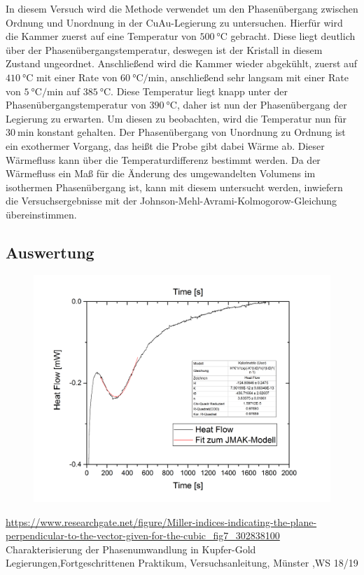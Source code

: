 \documentclass[
	a4paper,
	12pt,
	pagesize,
	ngerman
]{scrartcl}
\begin{document}
In diesem Versuch wird die Methode verwendet um den Phasenübergang zwischen Ordnung und Unordnung in der CuAu-Legierung zu untersuchen. Hierfür wird die Kammer zuerst auf eine Temperatur von $\SI{500}{\degreeCelsius}$ gebracht. Diese liegt deutlich über der Phasenübergangstemperatur, deswegen ist der Kristall in diesem Zustand ungeordnet. Anschließend wird die Kammer wieder abgekühlt, zuerst auf $\SI{410}{\degreeCelsius}$ mit einer Rate von $\SI{60}{\degreeCelsius/\minute}$, anschließend sehr langsam mit einer Rate von $\SI{5}{\degreeCelsius/\minute}$ auf $\SI{385}{\degreeCelsius}$. Diese Temperatur liegt knapp unter der Phasenübergangstemperatur von $\SI{390}{\degreeCelsius}$, daher ist nun der Phasenübergang der Legierung zu erwarten. Um diesen zu beobachten, wird die Temperatur nun für $\SI{30}{\minute}$ konstant gehalten. Der Phasenübergang von Unordnung zu Ordnung ist ein exothermer Vorgang, das heißt die Probe gibt dabei Wärme ab. Dieser Wärmefluss kann über die Temperaturdifferenz bestimmt werden. Da der Wärmefluss ein Maß für die Änderung des umgewandelten Volumens im isothermen Phasenübergang ist, kann mit diesem untersucht werden, inwiefern die Versuchsergebnisse mit der Johnson-Mehl-Avrami-Kolmogorow-Gleichung übereinstimmen.

\subsection{Auswertung}
\begin{figure}[h]
	\centering
	\includegraphics[scale=0.6]{Graph3.png}
	\caption{}
	\label{3}
\end{figure}	

\newpage

\begin{thebibliography}{9}
 \url{https://www.researchgate.net/figure/Miller-indices-indicating-the-plane-perpendicular-to-the-vector-given-for-the-cubic_fig7_302838100}\\
Charakterisierung der Phasenumwandlung in Kupfer-Gold Legierungen,Fortgeschrittenen Praktikum, Versuchsanleitung, Münster ,WS 18/19

\end{thebibliography}
\end{document}
